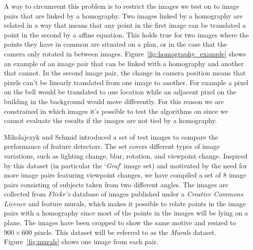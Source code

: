 A way to circumvent this problem is to restrict the images we test on to 
image pairs that are linked by a homography. Two images linked by a 
homography are related in a way that means that any point in the first 
image can be translated a point in the second by a affine equation. This 
holds true for two images where the points they have in common are 
situated on a plan, or in the case that the camera only rotated in 
between images.  Figure~\ref{fig:homography_example} shows an example of 
an image pair that can be linked with a homography and another that 
cannot. In the second image pair, the change in camera position means 
that pixels can't be linearly translated from one image to another. For 
example a pixel on the bell would be translated to one location while an 
adjacent pixel on the building in the background would
move differently. For this reason we are constrained in which images 
it's possible to test the algorithms on since we cannot evaluate the 
results if the images are not tied by a homography.

Mikolajczyk and Schmid  \cite{mikolajczyk2005performance} introduced a 
set of test images to compare the performance of feature detectors. The 
set covers different types of image variations, such as lighting change, 
blur, rotation, and viewpoint change. Inspired by this dataset (in 
particular the `\emph{Graf}' image set) and motivated by the need for 
more image pairs featuring viewpoint changes, we have compiled a set of 
8 image pairs consisting of subjects taken from two different angles.  
The images are collected from \emph{Flickr's} database of images 
published under a \emph{Creative Commons Licence} and feature murals, 
which makes it possible to relate points in the image pairs with a 
homography since most of the points in the images will be lying on a 
plane.  The images have been cropped to show the same motive and resized 
to $900\times 600$ pixels.  This dataset will be referred to as the 
\emph{Murals} dataset.  Figure~\ref{fig:murals} shows one image from 
each pair.

